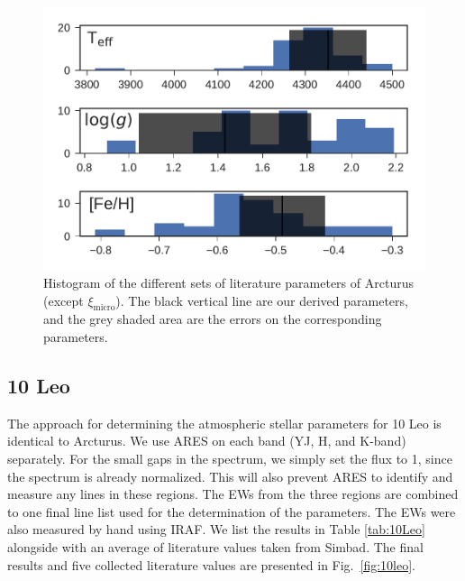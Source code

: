 \documentclass{aa}
\begin{document}
\begin{figure}[htpb!]
    \centering
    \includegraphics[width=1.0\linewidth]{figures/ArcturusParams.pdf}
    \caption{Histogram of the different sets of literature parameters of
             Arcturus (except $\xi_\mathrm{micro}$). The black vertical line are
             our derived parameters, and the grey shaded area are the errors on
             the corresponding parameters.}
    \label{fig:arcturus}
\end{figure}



\subsection{10 Leo}
\label{sec:10Leo}

The approach for determining the atmospheric stellar parameters for 10 Leo is
identical to Arcturus. We use ARES on each band (YJ, H, and K-band) separately.
For the small gaps in the spectrum, we simply set the flux to 1, since the
spectrum is already normalized. This will also prevent ARES to identify and
measure any lines in these regions. The EWs from the three regions are combined
to one final line list used for the determination of the parameters. The EWs
were also measured by hand using IRAF. We list the results in
Table \ref{tab:10Leo} alongside with an average of literature values taken from
Simbad. The final results and five collected literature values are presented in
Fig.~\ref{fig:10leo}.
\end{document}
